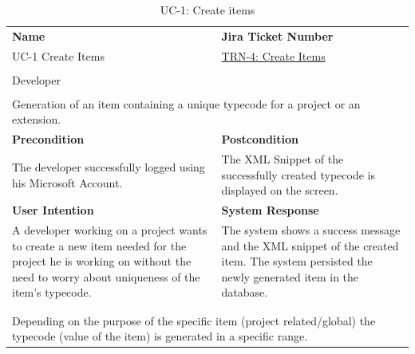 \begin{table}[H]
    \centering
    \begin{tabular}{|p{}|p{}|}

        \hline
        \rowcolor{gray!50}\textbf{Name} & \textbf{Jira Ticket Number} \\
        UC-1 Create Items &
        \href{https://fh-burgenland.atlassian.net/browse/TRN-4}{TRN-4: Create Items} \\ \hline

        \rowcolor{gray!50}\multicolumn{2}{|l|}{\textbf{User Role}} \\
        \multicolumn{2}{|l|}{Developer} \\ \hline

        \rowcolor{gray!50}\multicolumn{2}{|l|}{\textbf{Purpose}} \\
        \multicolumn{2}{|l|}{Generation of an item containing a unique typecode for a project or an extension.} \\ \hline

        \rowcolor{gray!50}\textbf{Precondition} & \textbf{Postcondition} \\
        The developer successfully logged using his Microsoft Account. &
        The XML Snippet of the successfully created typecode is displayed on the screen. \\ \hline

        \rowcolor{gray!50}\textbf{User Intention} & \textbf{System Response} \\
        A developer working on a project wants to create a new item needed for the project he is working on without the need to worry about uniqueness of the item's typecode. &
        The system shows a success message and the XML snippet of the created item. The system persisted the newly generated item in the database. \\ \hline

        \multicolumn{2}{|c|}{} \\ \hline

        \rowcolor{gray!50}\multicolumn{2}{|l|}{\textbf{Remarks}} \\
        \multicolumn{2}{|p{\textwidth}|}{Depending on the purpose of the specific item (project related/global) the typecode (value of the item) is generated in a specific range.} \\ \hline
    \end{tabular}
    \caption{UC-1: Create items}
    \label{tab:uc-1_create-items}
\end{table}

